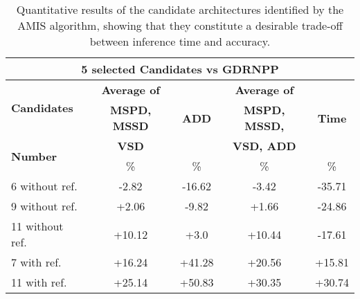 \begin{table}[ht]
\centering
\caption{Quantitative results of the candidate architectures identified by the AMIS algorithm, showing that they constitute a desirable trade-off between inference time and accuracy.}
\label{tab:Result of selected Candidates vs GDRNPP}
\begin{tabular}{@{}l|cccc@{}}
\toprule
\multicolumn{5}{c}{\textbf{5 selected Candidates vs GDRNPP}}\\
\midrule
\multirow{2}{*}{\textbf{Candidates}}& \textbf{Average of} & \multirow{3}{*}{\textbf{ADD}}& \textbf{Average of }&  \multirow{3}{*}{\textbf{Time}}\\
& \textbf{MSPD, MSSD} &  & \textbf{MSPD, MSSD,} &   \\
\multirow{2}{*}{\textbf{Number}}& \textbf{VSD} &  & \textbf{VSD, ADD} &   \\
& \% & \% & \% & \%  \\
\midrule
6 without ref. & -2.82 & -16.62 & -3.42 & -35.71\\
\midrule
9 without ref. & +2.06 & -9.82 & +1.66 & -24.86\\
\midrule
11 without ref.{ } & +10.12 & +3.0 & +10.44 & -17.61\\
\midrule
7 with ref. & +16.24 & +41.28 & +20.56 & +15.81\\
\midrule
11 with ref. & +25.14 & +50.83 & +30.35 & +30.74\\
\bottomrule
\end{tabular}
\end{table}